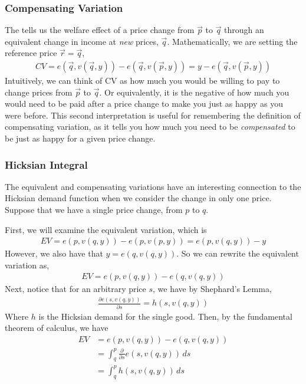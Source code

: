 \subsubsection*{Compensating Variation}
The  tells us the welfare effect of a price change from $\vec{p}$ to $\vec{q}$ through an equivalent change in income at \emph{new} prices, $\vec{q}$. Mathematically, we are setting the reference price $\vec{r} = \vec{q}$,
\begin{align*}
    CV = e(\vec{q}, v(\vec{q}, y)) - e(\vec{q}, v(\vec{p}, y)) = y - e(\vec{q}, v(\vec{p}, y))
\end{align*}
Intuitively, we can think of CV as how much you would be willing to pay to change prices from $\vec{p}$ to $\vec{q}$. Or equivalently, it is the negative of how much you would need to be paid after a price change to make you just as happy as you were before. This second interpretation is useful for remembering the definition of compensating variation, as it tells you how much you need to be \emph{compensated} to be just as happy for a given price change. 

\subsubsection*{Hicksian Integral}
The equivalent and compensating variations have an interesting connection to the Hicksian demand function when we consider the change in only one price.  Suppose that we have a single price change, from $p$ to $q$.

First, we will examine the equivalent variation, which is
\begin{align*}
    EV = e(p, v(q, y)) - e(p, v(p, y)) = e(p, v(q, y)) - y
\end{align*}
However, we also have that $y = e(q, v(q, y))$. So we can rewrite the equivalent variation as,
\begin{align*}
    EV = e(p, v(q, y)) - e(q, v(q, y))
\end{align*}
Next, notice that for an arbitrary price $s$, we have by Shephard's Lemma,
\begin{align*}
    \frac{\partial e(s, v(q, y))}{\partial s} = h(s, v(q, y))
\end{align*}
Where $h$ is the Hicksian demand for the single good. Then, by the fundamental theorem of calculus, we have
\begin{align*}
    EV &= e(p, v(q, y)) - e(q, v(q, y)) \\
    &= \int_q^p \frac{\partial}{\partial s} e(s, v(q, y)) \, ds \\
    &= \int_q^p h(s, v(q, y)) \, ds
\end{align*}

